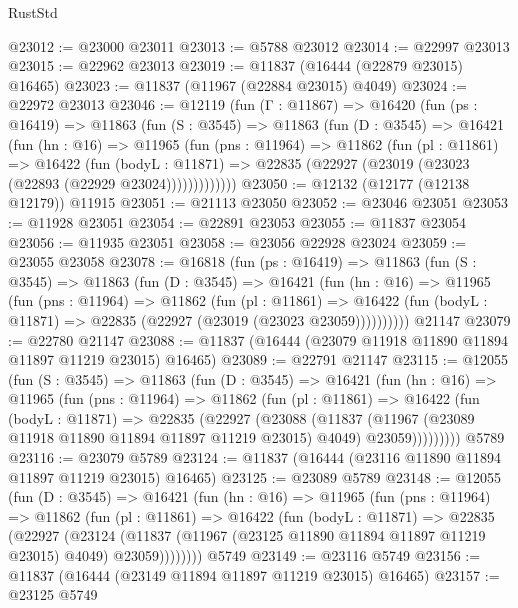 \begin{lexlean}{RustStd}
\begin{coremodule}
@23012 := @23000 @23011
@23013 := @5788 @23012
@23014 := @22997 @23013
@23015 := @22962 @23013
@23019 := @11837 (@16444 (@22879 @23015) @16465)
@23023 := @11837 (@11967 (@22884 @23015) @4049)
@23024 := @22972 @23013
@23046 := @12119
    (fun (Γ : @11867) =>
    @16420
      (fun (ps : @16419) =>
      @11863
        (fun (S : @3545) =>
        @11863
          (fun (D : @3545) =>
          @16421
            (fun (hn : @16) =>
            @11965
              (fun (pns : @11964) =>
              @11862
                (fun (pl : @11861) =>
                @16422
                  (fun (bodyL : @11871) =>
                  @22835 (@22927 (@23019 (@23023 (@22893 (@22929 @23024)))))))))))))
@23050 := @12132 (@12177 (@12138 @12179)) @11915
@23051 := @21113 @23050
@23052 := @23046 @23051
@23053 := @11928 @23051
@23054 := @22891 @23053
@23055 := @11837 @23054
@23056 := @11935 @23051
@23058 := @23056 @22928 @23024
@23059 := @23055 @23058
@23078 := @16818
    (fun (ps : @16419) =>
    @11863
      (fun (S : @3545) =>
      @11863
        (fun (D : @3545) =>
        @16421
          (fun (hn : @16) =>
          @11965
            (fun (pns : @11964) =>
            @11862
              (fun (pl : @11861) =>
              @16422 (fun (bodyL : @11871) => @22835 (@22927 (@23019 (@23023 @23059))))))))))
    @21147
@23079 := @22780 @21147
@23088 := @11837 (@16444 (@23079 @11918 @11890 @11894 @11897 @11219 @23015) @16465)
@23089 := @22791 @21147
@23115 := @12055
    (fun (S : @3545) =>
    @11863
      (fun (D : @3545) =>
      @16421
        (fun (hn : @16) =>
        @11965
          (fun (pns : @11964) =>
          @11862
            (fun (pl : @11861) =>
            @16422
              (fun (bodyL : @11871) =>
              @22835
                (@22927
                  (@23088
                    (@11837
                      (@11967 (@23089 @11918 @11890 @11894 @11897 @11219 @23015) @4049)
                      @23059)))))))))
    @5789
@23116 := @23079 @5789
@23124 := @11837 (@16444 (@23116 @11890 @11894 @11897 @11219 @23015) @16465)
@23125 := @23089 @5789
@23148 := @12055
    (fun (D : @3545) =>
    @16421
      (fun (hn : @16) =>
      @11965
        (fun (pns : @11964) =>
        @11862
          (fun (pl : @11861) =>
          @16422
            (fun (bodyL : @11871) =>
            @22835
              (@22927
                (@23124
                  (@11837 (@11967 (@23125 @11890 @11894 @11897 @11219 @23015) @4049) @23059))))))))
    @5749
@23149 := @23116 @5749
@23156 := @11837 (@16444 (@23149 @11894 @11897 @11219 @23015) @16465)
@23157 := @23125 @5749

\end{coremodule}
\end{lexlean}
